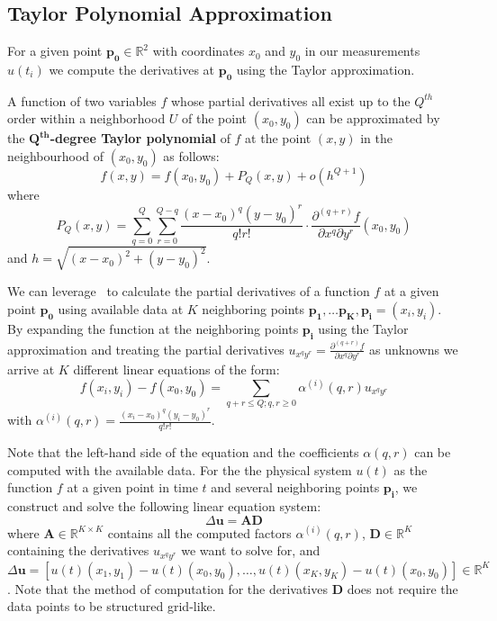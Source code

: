 \documentclass[runningheads]{llncs}
\begin{document}
\subsection{Taylor Polynomial Approximation} \label{taylor_approx}
For a given point $\mathbf{p_0}\in\mathbb{R}^2$ with coordinates $x_0$ and $y_0$ in our measurements $u(t_i)$ we compute the derivatives at $\mathbf{p_0}$ using the Taylor approximation.
\begin{theorem}
\label{th:taylor_approx}
A function of two variables $f$ whose partial derivatives all exist up to the $Q^{th}$ order within a neighborhood $U$ of the point $(x_0,y_0)$ can be approximated by the \textbf{$\mathbf{Q^{th}}$-degree Taylor polynomial} of $f$ at the point $(x,y)$ in the neighbourhood of $(x_0,y_0)$ as follows:
\begin{equation}
    f(x,y) = f(x_0, y_0) + P_Q(x,y) + o(h^{Q+1})
\end{equation}
where 
\begin{equation}
    P_Q(x,y) = \sum_{q=0}^Q \sum_{r=0}^{Q-q} \frac{(x-x_0)^q(y-y_0)^r }{q!r!} \cdot \frac{\partial^{(q+r)}f}{\partial x^q \partial y^r}(x_0,y_0)
\end{equation}
and $h = \sqrt{(x-x_0)^2+(y-y_0)^2}$.
\end{theorem}
%
We can leverage~ to calculate the partial derivatives of a function $f$ at a given point $\mathbf{p_0}$ using available data at $K$ neighboring points $\mathbf{p_1}, \ldots \mathbf{p_K},\mathbf{p_i}=(x_i,y_i)$.
By expanding the function at the neighboring points $\mathbf{p_i}$ using the Taylor approximation and treating the partial derivatives $u_{x^qy^r}=\frac{\partial^{(q+r)}f}{\partial x^q \partial y^r}$ as unknowns we arrive at $K$ different linear equations of the form:
\begin{equation}
    f(x_i, y_i)-f(x_0, y_0) = \sum_{q+r\leq Q; q,r\geq 0}\alpha^{(i)}(q, r)u_{x^qy^r}
\end{equation}
with $\alpha^{(i)}(q, r) = \frac{(x_i-x_0)^q(y_i-y_0)^r }{q!r!}$.

Note that the left-hand side of the equation and the coefficients $\alpha(q, r)$ can be computed with the available data.
For the the physical system $u(t)$ as the function $f$ at a given point in time $t$ and several neighboring points $\mathbf{p_i}$, we construct and solve the following linear equation system:
\begin{equation}
\label{eq:derivative_linear_system}
    \Delta \mathbf{u}=\mathbf{A}\mathbf{D}
\end{equation}
where $\mathbf{A} \in \mathbb{R}^{K\times K}$ contains all the computed factors $\alpha^{(i)}(q,r)$, $\mathbf{D} \in \mathbb{R}^K$ containing the derivatives $u_{x^qy^r}$  we want to solve for, and $\Delta \mathbf{u} = [u(t)(x_1,y_1) - u(t)(x_0,y_0),\ldots,u(t)(x_K,y_K) - u(t)(x_0,y_0)]\in \mathbb{R}^K$. 
Note that the method of computation for the derivatives $\mathbf{D}$ does not require the data points to be structured grid-like.
\end{document}
